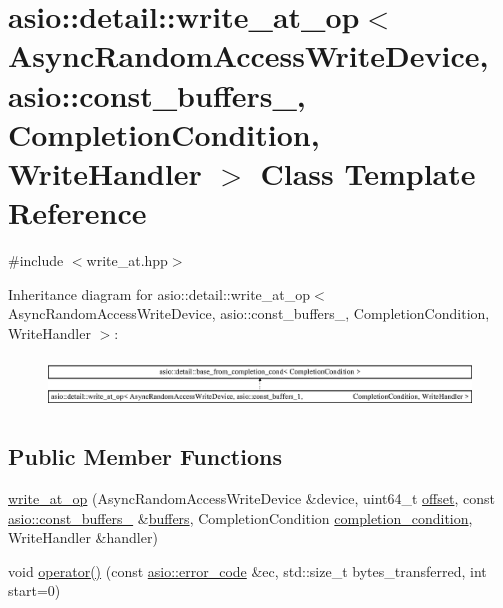 \hypertarget{classasio_1_1detail_1_1write__at__op_3_01_async_random_access_write_device_00_01asio_1_1const__bfac42b27d8d08bd8bf66a7fd473767cd}{}\section{asio\+:\+:detail\+:\+:write\+\_\+at\+\_\+op$<$ Async\+Random\+Access\+Write\+Device, asio\+:\+:const\+\_\+buffers\+\_, Completion\+Condition, Write\+Handler $>$ Class Template Reference}
\label{classasio_1_1detail_1_1write__at__op_3_01_async_random_access_write_device_00_01asio_1_1const__bfac42b27d8d08bd8bf66a7fd473767cd}


{\ttfamily \#include $<$write\+\_\+at.\+hpp$>$}

Inheritance diagram for asio\+:\+:detail\+:\+:write\+\_\+at\+\_\+op$<$ Async\+Random\+Access\+Write\+Device, asio\+:\+:const\+\_\+buffers\+\_, Completion\+Condition, Write\+Handler $>$\+:\begin{figure}[H]
\begin{center}
\leavevmode
\includegraphics[height=1.346154cm]{classasio_1_1detail_1_1write__at__op_3_01_async_random_access_write_device_00_01asio_1_1const__bfac42b27d8d08bd8bf66a7fd473767cd}
\end{center}
\end{figure}
\subsection*{Public Member Functions}
\begin{DoxyCompactItemize}
\item 
\hyperlink{classasio_1_1detail_1_1write__at__op_3_01_async_random_access_write_device_00_01asio_1_1const__bfac42b27d8d08bd8bf66a7fd473767cd_ad8edb8c2c4c08902e4db2ff78059a581}{write\+\_\+at\+\_\+op} (Async\+Random\+Access\+Write\+Device \&device, uint64\+\_\+t \hyperlink{group__async__read__at_ga8dcdb41a4adfd6fe5322b5dd666d9f29}{offset}, const \hyperlink{classasio_1_1const__buffers__1}{asio\+::const\+\_\+buffers\+\_} \&\hyperlink{group__async__read_ga54dede45c3175148a77fe6635222c47d}{buffers}, Completion\+Condition \hyperlink{group__async__read_gae2e215d5013596cc2b385bb6c13fa518}{completion\+\_\+condition}, Write\+Handler \&handler)
\item 
void \hyperlink{classasio_1_1detail_1_1write__at__op_3_01_async_random_access_write_device_00_01asio_1_1const__bfac42b27d8d08bd8bf66a7fd473767cd_a2b8ad5e9987ee33cbfd004dae36f4ba1}{operator()} (const \hyperlink{classasio_1_1error__code}{asio\+::error\+\_\+code} \&ec, std\+::size\+\_\+t bytes\+\_\+transferred, int start=0)
\end{DoxyCompactItemize}
